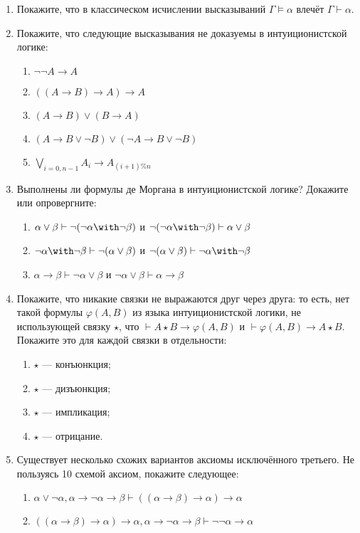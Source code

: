 \documentclass[10pt,a4paper,oneside]{article}
\begin{document}
\begin{enumerate}
\item Покажите, что в классическом исчислении высказываний $\Gamma \models \alpha$ влечёт $\Gamma \vdash \alpha$.

\item Покажите, что следующие высказывания не доказуемы в интуиционистской логике:
\begin{enumerate}
\item $\neg\neg A \rightarrow A$
\item $((A \rightarrow B) \rightarrow A) \rightarrow A$
\item $(A \rightarrow B) \vee (B \rightarrow A)$
\item $(A \rightarrow B \vee \neg B) \vee (\neg A \rightarrow B \vee \neg B)$
\item $\bigvee_{i=0,n-1} A_i \rightarrow A_{(i+1) \% n}$
\end{enumerate}

\item Выполнены ли формулы де Моргана в интуиционистской логике? Докажите или опровергните:
\begin{enumerate}
\item $\alpha\vee\beta \vdash \neg(\neg\alpha\with\neg\beta)$ и $\neg(\neg\alpha\with\neg\beta) \vdash \alpha\vee\beta$
\item $\neg\alpha\with\neg\beta \vdash \neg(\alpha\vee\beta)$ и $\neg(\alpha\vee\beta) \vdash \neg\alpha\with\neg\beta$
\item $\alpha\rightarrow\beta \vdash \neg\alpha\vee\beta$ и $\neg\alpha\vee\beta \vdash \alpha\rightarrow\beta$
\end{enumerate}

\item Покажите, что никакие связки не выражаются друг через друга: то есть, нет такой формулы $\varphi(A,B)$ из языка 
интуиционистской логики, не использующей связку $\star$, что $\vdash A \star B \rightarrow \varphi(A,B)$ и $\vdash\varphi(A,B) \rightarrow A \star B$.
Покажите это для каждой связки в отдельности:
\begin{enumerate}
\item $\star$ --- конъюнкция;
\item $\star$ --- дизъюнкция;
\item $\star$ --- импликация;
\item $\star$ --- отрицание.
\end{enumerate}

\item Существует несколько схожих вариантов аксиомы исключённого третьего. Не пользуясь 10 схемой аксиом, покажите
следующее:
\begin{enumerate}
\item $\alpha\vee\neg\alpha, \alpha\rightarrow\neg\alpha\rightarrow\beta \vdash ((\alpha\rightarrow\beta)\rightarrow\alpha)\rightarrow\alpha$
\item $((\alpha\rightarrow\beta)\rightarrow\alpha)\rightarrow\alpha, \alpha\rightarrow\neg\alpha\rightarrow\beta \vdash \neg\neg\alpha\rightarrow\alpha$
\end{enumerate}


\end{enumerate}
\end{document}
